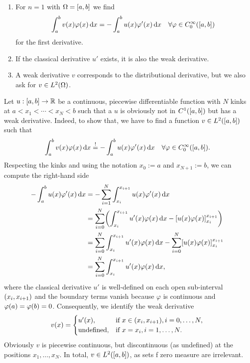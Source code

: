 \begin{remark}
	\begin{enumerate}
		\item For \(n = 1\) with \(\Omega = \brackets*{a, b}\) we find
		\[
			\int_a^b v\parentheses*{x}\varphi\parentheses*{x}\d x = -\int_a^b u\parentheses*{x}\varphi'\parentheses*{x}\d x \quad \forall \varphi \in C_0^\infty\parentheses*{\brackets*{a ,b}}
		\]
		for the first derivative.
		\item If the classical derivative \(u'\) exists, it is also the weak derivative.
		\item A weak derivative \(v\) corresponds to the distributional derivative, but we also ask for \(v \in L^2\parentheses*{\Omega}\).
	\end{enumerate}
\end{remark}

\begin{example}
	Let \(u: \brackets*{a, b} \to \R\) be a continuous, piecewise differentiable function with \(N\) kinks at \(a < x_1 < \cdots < x_N < b\) such that a \(u\) is obviously not in \(C^1\parentheses*{\brackets*{a, b}}\) but has a weak derivative.
	Indeed, to show that, we have to find a function \(v \in L^2\parentheses*{\brackets*{a, b}}\) such that
	\[
		\int_a^b v\parentheses*{x}\varphi\parentheses*{x}\d x \stackrel{!}{=} -\int_a^b u\parentheses*{x}\varphi'\parentheses*{x}\d x \quad \forall \varphi \in C_0^\infty\parentheses*{\brackets*{a ,b}}.
	\]
	Respecting the kinks and using the notation \(x_0 := a\) and \(x_{N + 1} := b\), we can compute the right-hand side
	\begin{align*}
		-\int_a^b u\parentheses*{x}\varphi'\parentheses*{x}\d x &= -\sum_{i = 1}^N \int_{x_i}^{x_{i + 1}}u\parentheses*{x}\varphi'\parentheses*{x}\d x\\
		&= \sum_{i = 0}^N \parentheses*{\int_{x_i}^{x_{i + 1}}u'\parentheses*{x}\varphi\parentheses*{x}\d x - \brackets*{u\parentheses*{x}\varphi\parentheses*{x}}_{x_i}^{x_{i + 1}}}\\
		&= \sum_{i = 0}^N \int_{x_i}^{x_{i + 1}}u'\parentheses*{x}\varphi\parentheses*{x}\d x - \sum_{i = 0}^N \brackets*{u\parentheses*{x}\varphi\parentheses*{x}}_{x_i}^{x_{i + 1}}\\
		&= \sum_{i = 0}^N \int_{x_i}^{x_{i + 1}}u'\parentheses*{x}\varphi\parentheses*{x}\d x,
	\end{align*}
	where the classical derivative \(u'\) is well-defined on each open sub-interval \(\parentheses*{x_i, x_{i + 1}}\) and the boundary terms vanish because \(\varphi\) is continuous and \(\varphi\parentheses*{a} = \varphi\parentheses*{b} = 0\).
	Consequently, we identify the weak derivative
	\[
		v\parentheses*{x} = \begin{cases}
			u'\parentheses*{x}, & \text{if }x \in \parentheses*{x_i, x_{i + 1}}, i = 0, \ldots, N,\\
			\text{undefined}, & \text{if }x = x_i, i = 1, \ldots, N.
		\end{cases}
	\]
	Obviously \(v\) is piecewise continuous, but discontinuous (as undefined) at the positions \(x_1, \ldots, x_N\).
	In total, \(v \in L^2\parentheses*{\brackets*{a, b}}\), as sets f zero measure are irrelevant.
\end{example}

